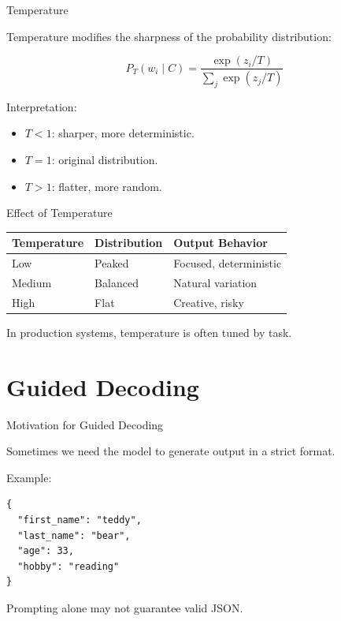 \documentclass[aspectratio=169]{beamer}
\begin{document}
\begin{frame}{Temperature}

Temperature modifies the sharpness of the probability distribution:

\[
P_T(w_i \mid C)
=
\frac{\exp(z_i/T)}
{\sum_j \exp(z_j/T)}
\]

\vspace{0.4cm}

Interpretation:

\begin{itemize}
    \item $T < 1$: sharper, more deterministic.
    \item $T = 1$: original distribution.
    \item $T > 1$: flatter, more random.
\end{itemize}

\end{frame}

\begin{frame}{Effect of Temperature}

\begin{table}
\centering
\begin{tabular}{lll}
\toprule
Temperature & Distribution & Output Behavior \\
\midrule
Low & Peaked & Focused, deterministic \\
Medium & Balanced & Natural variation \\
High & Flat & Creative, risky \\
\bottomrule
\end{tabular}
\end{table}

\vspace{0.4cm}

In production systems, temperature is often tuned by task.

\end{frame}

\section{Guided Decoding}

\begin{frame}{Motivation for Guided Decoding}

Sometimes we need the model to generate output in a strict format.

\vspace{0.4cm}

Example:

\begin{verbatim}
{
  "first_name": "teddy",
  "last_name": "bear",
  "age": 33,
  "hobby": "reading"
}
\end{verbatim}

\vspace{0.4cm}

Prompting alone may not guarantee valid JSON.

\end{frame}
\end{document}
